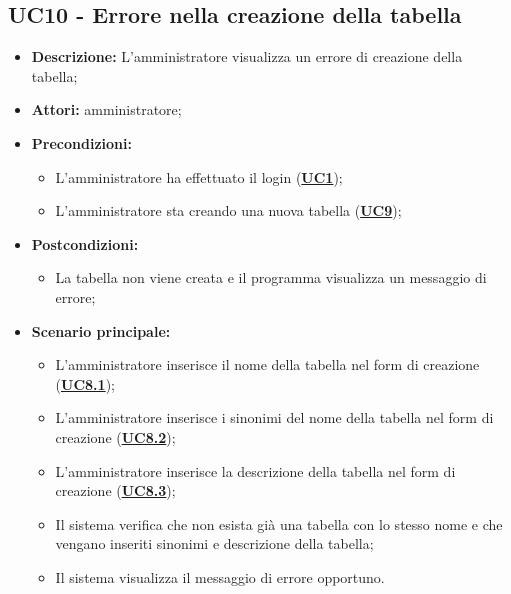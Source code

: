 \subsection{UC10 - Errore nella creazione della tabella}
\label{sec:UC10}
\begin{itemize}
	\item \textbf{Descrizione:} L’amministratore visualizza un errore di creazione della tabella;
	\item \textbf{Attori:} amministratore;
	\item \textbf{Precondizioni:} 
	\begin{itemize}
		\item L’amministratore ha effettuato il login (\hyperref[sec:UC1]{\textbf{UC1}});
		\item L’amministratore sta creando una nuova tabella (\hyperref[sec:UC9]{\textbf{UC9}});
	\end{itemize}
	\item \textbf{Postcondizioni:} 
	\begin{itemize}
		\item La tabella non viene creata e il programma visualizza un messaggio di errore;
	\end{itemize}
	\item \textbf{Scenario principale:} 
	\begin{itemize}
		\item L’amministratore inserisce il nome della tabella nel form di creazione (\hyperref[sec:UC8.1]{\textbf{UC8.1}});
		\item L’amministratore inserisce i sinonimi del nome della tabella nel form di creazione (\hyperref[sec:UC8.2]{\textbf{UC8.2}});
		\item L’amministratore inserisce la descrizione della tabella nel form di creazione (\hyperref[sec:UC8.3]{\textbf{UC8.3}});
		\item Il sistema verifica che non esista già una tabella con lo stesso nome e che vengano inseriti sinonimi e descrizione della tabella;
		\item Il sistema visualizza il messaggio di errore opportuno.
	\end{itemize}
\end{itemize}

